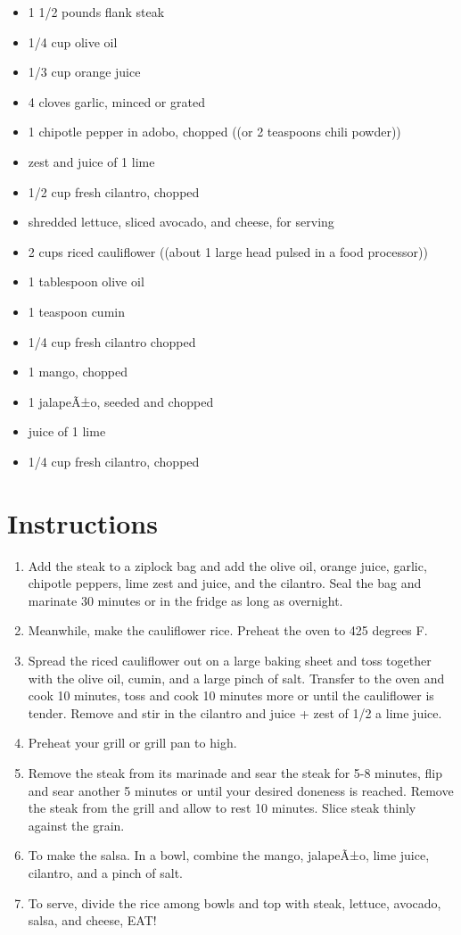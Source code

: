 \documentclass[
  letterpaper,
  DIV=11,
  numbers=noendperiod,
  titlepage=false]{scrreprt}
\providecommand{\tightlist}{%
  \setlength{\itemsep}{0pt}\setlength{\parskip}{0pt}}\usepackage{longtable,booktabs,array}
\begin{document}
\begin{itemize}
\tightlist
\item
  1 1/2 pounds flank steak
\item
  1/4 cup olive oil
\item
  1/3 cup orange juice
\item
  4 cloves garlic, minced or grated
\item
  1 chipotle pepper in adobo, chopped ((or 2 teaspoons chili powder))
\item
  zest and juice of 1 lime
\item
  1/2 cup fresh cilantro, chopped
\item
  shredded lettuce, sliced avocado, and cheese, for serving
\item
  2 cups riced cauliflower ((about 1 large head pulsed in a food
  processor))
\item
  1 tablespoon olive oil
\item
  1 teaspoon cumin
\item
  1/4 cup fresh cilantro chopped
\item
  1 mango, chopped
\item
  1 jalapeÃ±o, seeded and chopped
\item
  juice of 1 lime
\item
  1/4 cup fresh cilantro, chopped
\end{itemize}

\section{Instructions}\label{instructions-117}

\begin{enumerate}
\def\labelenumi{\arabic{enumi}.}
\tightlist
\item
  Add the steak to a ziplock bag and add the olive oil, orange juice,
  garlic, chipotle peppers, lime zest and juice, and the cilantro. Seal
  the bag and marinate 30 minutes or in the fridge as long as overnight.
\item
  Meanwhile, make the cauliflower rice. Preheat the oven to 425 degrees
  F.
\item
  Spread the riced cauliflower out on a large baking sheet and toss
  together with the olive oil, cumin, and a large pinch of salt.
  Transfer to the oven and cook 10 minutes, toss and cook 10 minutes
  more or until the cauliflower is tender. Remove and stir in the
  cilantro and juice + zest of 1/2 a lime juice.
\item
  Preheat your grill or grill pan to high.
\item
  Remove the steak from its marinade and sear the steak for 5-8 minutes,
  flip and sear another 5 minutes or until your desired doneness is
  reached. Remove the steak from the grill and allow to rest 10 minutes.
  Slice steak thinly against the grain.
\item
  To make the salsa. In a bowl, combine the mango, jalapeÃ±o, lime
  juice, cilantro, and a pinch of salt.
\item
  To serve, divide the rice among bowls and top with steak, lettuce,
  avocado, salsa, and cheese, EAT!
\end{enumerate}
\end{document}

